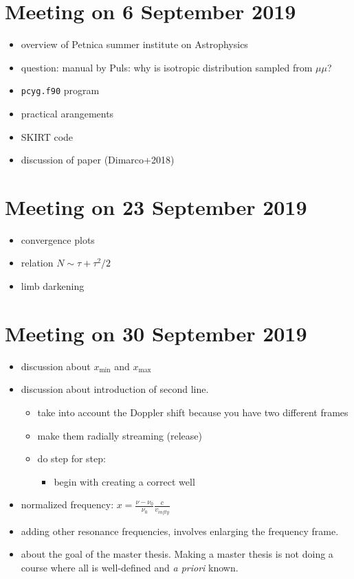 \documentclass[../main/main.tex]{subfiles}
\begin{document}
\section{Meeting on 6 September 2019}
\begin{itemize}
\item overview of Petnica summer institute on Astrophysics

\item question: manual by Puls: why is isotropic distribution sampled from $\mu \mu$?

\item \texttt{pcyg.f90} program

\item practical arangements  

\item SKIRT code 
\item discussion of paper (Dimarco+2018)
\end{itemize}

\section{Meeting on 23 September 2019}
\begin{itemize}
\item convergence plots
\item relation $N \sim \tau + \tau^2/2$
\item limb darkening
\end{itemize}

\section{Meeting on 30 September 2019}
\begin{itemize}
\item discussion about $x_{\text{min}}$ and $x_{\text{max}}$
\item discussion about introduction of second line. 
\begin{itemize}
\item take into account the Doppler shift because you have two different frames

\item make them radially streaming (release)
\item do step for step:
\begin{itemize}
\item begin with creating a correct well
\end{itemize}
\end{itemize}

\item normalized frequency: $x = \frac{\nu - \nu_0}{\nu_ 0}\frac{c}{v_{infty}}$

\item adding other resonance frequencies, involves enlarging the frequency frame.

\item about the goal of the master thesis. Making a master thesis is not doing a course where all is well-defined and \textit{a priori} known.
\end{itemize}
\end{document}
